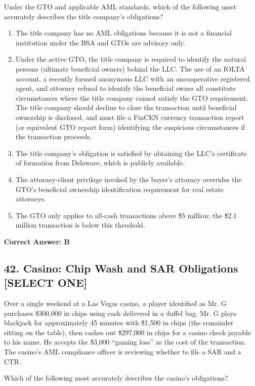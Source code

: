 \documentclass[11pt,a4paper]{article}
\begin{document}
	Under the GTO and applicable AML standards, which of the following most accurately describes the title company's obligations?
	
	\begin{enumerate}[label=\Alph*.]
		\item The title company has no AML obligations because it is not a financial institution under the BSA and GTOs are advisory only.
		\item Under the active GTO, the title company is required to identify the natural persons (ultimate beneficial owners) behind the LLC. The use of an IOLTA account, a recently formed anonymous LLC with an uncooperative registered agent, and attorney refusal to identify the beneficial owner all constitute circumstances where the title company cannot satisfy the GTO requirement. The title company should decline to close the transaction until beneficial ownership is disclosed, and must file a FinCEN currency transaction report (or equivalent GTO report form) identifying the suspicious circumstances if the transaction proceeds.
		\item The title company's obligation is satisfied by obtaining the LLC's certificate of formation from Delaware, which is publicly available.
		\item The attorney-client privilege invoked by the buyer's attorney overrides the GTO's beneficial ownership identification requirement for real estate attorneys.
		\item The GTO only applies to all-cash transactions above \$5 million; the \$2.1 million transaction is below this threshold.
	\end{enumerate}
	\textbf{Correct Answer: B}
	
	\subsection{42. Casino: Chip Wash and SAR Obligations \textnormal{[SELECT ONE]}}
	
	Over a single weekend at a Las Vegas casino, a player identified as Mr. G purchases \$300,000 in chips using cash delivered in a duffel bag. Mr. G plays blackjack for approximately 45 minutes with \$1,500 in chips (the remainder sitting on the table), then cashes out \$297,000 in chips for a casino check payable to his name. He accepts the \$3,000 ``gaming loss'' as the cost of the transaction. The casino's AML compliance officer is reviewing whether to file a SAR and a CTR.
	
	Which of the following most accurately describes the casino's obligations?
	
\end{document}
